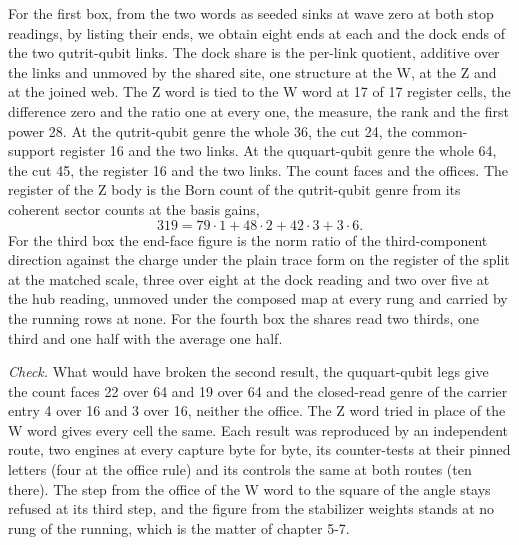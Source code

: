 \begin{chproof}
For the first box, from the two words as seeded sinks at wave zero at both stop readings, by listing their ends, we obtain eight ends at each and the dock ends of the two qutrit-qubit links. The dock share is the per-link quotient, additive over the links and unmoved by the shared site, one structure at the W, at the Z and at the joined web. The Z word is tied to the W word at 17 of 17 register cells, the difference zero and the ratio one at every one, the measure, the rank and the first power 28. At the qutrit-qubit genre the whole 36, the cut 24, the common-support register 16 and the two links. At the ququart-qubit genre the whole 64, the cut 45, the register 16 and the two links. The count faces and the offices. The register of the Z body is the Born count of the qutrit-qubit genre from its coherent sector counts at the basis gains,
\begin{equation}
319 = 79 \cdot 1 + 48 \cdot 2 + 42 \cdot 3 + 3 \cdot 6 .
\end{equation}
For the third box the end-face figure is the norm ratio of the third-component direction against the charge under the plain trace form on the register of the split at the matched scale, three over eight at the dock reading and two over five at the hub reading, unmoved under the composed map at every rung and carried by the running rows at none. For the fourth box the shares read two thirds, one third and one half with the average one half.

\emph{Check.} What would have broken the second result, the ququart-qubit legs give the count faces 22 over 64 and 19 over 64 and the closed-read genre of the carrier entry 4 over 16 and 3 over 16, neither the office. The Z word tried in place of the W word gives every cell the same. Each result was reproduced by an independent route, two engines at every capture byte for byte, its counter-tests at their pinned letters (four at the office rule) and its controls the same at both routes (ten there).
The step from the office of the W word to the square of the angle stays refused at its third step, and the figure from the stabilizer weights stands at no rung of the running, which is the matter of chapter 5-7.
\end{chproof}
\label{chend:VI-6-weak-angle}
